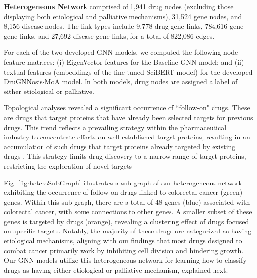 \documentclass[journal,twoside,web]{ieeecolor}
\begin{document}
\textbf{Heterogeneous Network}
comprised of 1,941 drug nodes (excluding those displaying both etiological and palliative mechanisms), 31,524 gene nodes, and 8,156 disease nodes.
The link types include 9,778 drug-gene links, 784,616 gene-gene links, and 27,692 disease-gene links, for a total of 822,086 edges.

For each of the two developed GNN models, we computed the following node feature matrices: (i) EigenVector features for the Baseline GNN model; and
(ii) textual features (embeddings of the fine-tuned SciBERT model) for the developed DruGNNosis-MoA model.
In both models, drug nodes are assigned a label of either etiological or palliative.



Topological analyses revealed a significant occurrence of ``follow-on" drugs.
These are drugs that target proteins that have already been selected targets for previous drugs.
This trend reflects a prevailing strategy within the pharmaceutical industry to concentrate efforts on well-established target proteins, resulting in an accumulation of such drugs that target proteins already targeted by existing drugs \cite{aronson2020me}.
This strategy limits drug discovery to a narrow range of target proteins, restricting the exploration of novel targets

Fig. \ref{fig:heteroSubGraph} illustrates a sub-graph of our heterogeneous network exhibiting the occurrence of follow-on drugs linked to colorectal cancer (green) genes.
Within this sub-graph, there are a total of 48 genes (blue) associated with colorectal cancer, with some connections to other genes.
A smaller subset of these genes is targeted by drugs (orange), revealing a clustering effect of drugs focused on specific targets.
Notably, the majority of these drugs are categorized as having etiological mechanisms, aligning with our findings that most drugs designed to combat cancer primarily work by inhibiting cell division and hindering growth.
Our GNN models utilize this heterogeneous network for learning how to classify drugs as having either etiological or palliative mechanism, explained next.
\end{document}
